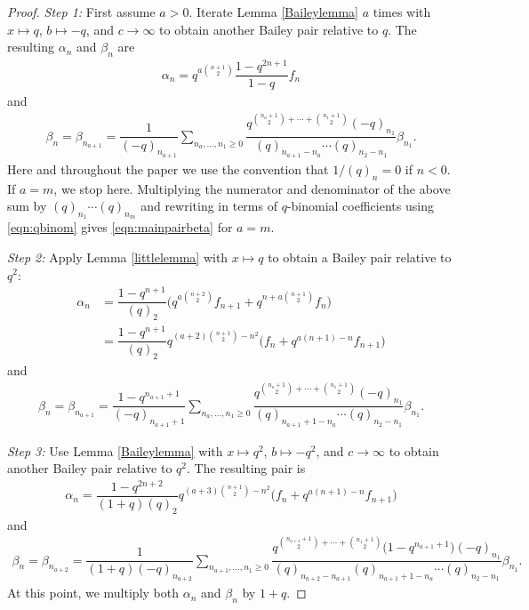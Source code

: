 \documentclass[11pt]{article}
\numberwithin{equation}{section}
\numberwithin{equation}{section}
\begin{document}
\begin{proof}
	{\it Step 1\emph{:}} First assume $a > 0$. Iterate Lemma \ref{Baileylemma} $a$ times with $x\mapsto q$, $b\mapsto -q$, and $c\rightarrow \infty$ to obtain another Bailey pair relative to $q$. The resulting $\alpha_n$ and $\beta_n$ are
	\begin{align}
		\alpha_n=q^{a\binom{n+1}{2}}\dfrac{1-q^{2n+1}}{1-q}f_n
		\label{eqn:alphafn}
	\end{align}
	and
	\begin{align}
		\beta_n=\beta_{n_{a+1}}=
		\dfrac{1}{(-q)_{n_{a+1}}}\sum_{n_a,\dots,n_1\geq 0}
		\dfrac{q^{\binom{n_a+1}{2}+\cdots+\binom{n_1+1}{2}}(-q)_{n_1}}{(q)_{n_{a+1}-n_a}\cdots (q)_{n_2-n_1}}\beta_{n_1}. \label{eqn:betastep1}
	\end{align}
	Here and throughout the paper we use the convention that $1/(q)_n = 0$ if $n <0$.
	If $a=m$, we stop here. Multiplying the numerator and denominator of the above sum by $(q)_{n_1} \cdots (q)_{n_m}$ and rewriting in terms of $q$-binomial coefficients using \eqref{eqn:qbinom} gives \eqref{eqn:mainpairbeta} for $a=m$.
	
	{\it Step 2\emph{:}} Apply Lemma \ref{littlelemma} with $x \mapsto q$ to obtain a Bailey pair relative to $q^2$:
	\begin{align*}
		\alpha_n &{}= \dfrac{1-q^{n+1}}{(q)_2}\bigl(
		q^{a\binom{n+2}{2}}f_{n+1} + q^{n+a\binom{n+1}{2}}f_n\bigr)\\
		&{}=\dfrac{1-q^{n+1}}{(q)_2}q^{(a+2)\binom{n+1}{2}-n^2}
		\bigl(
		f_n+q^{a(n+1)-n}f_{n+1}\bigr)
	\end{align*}
	and
	\begin{align*}
		\beta_n=\beta_{n_{a+1}}=
		\dfrac{1-q^{n_{a+1}+1}}{(-q)_{n_{a+1}+1}}\sum_{n_a,\dots,n_1\geq 0}
		\dfrac{q^{\binom{n_a+1}{2}+\cdots+\binom{n_1+1}{2}}(-q)_{n_1}}{(q)_{n_{a+1}+1-n_a}\cdots (q)_{n_2-n_1}}\beta_{n_1}.
	\end{align*}
	
	
	{\it Step 3\emph{:}} Use Lemma \ref{Baileylemma} with $x\mapsto q^2$, $b\mapsto-q^2$, and $c \to \infty$ to obtain another Bailey pair relative to $q^2$. The resulting pair is
	\begin{align*}
		\alpha_n
		=\dfrac{1-q^{2n+2}}{(1+q)(q)_2}q^{(a+3)\binom{n+1}{2}-n^2}
		\bigl(
		f_n+q^{a(n+1)-n}f_{n+1}\bigr)
	\end{align*}
	and
	\begin{align*}
		\beta_n=\beta_{n_{a+2}}=
		\dfrac{1}{(1+q)(-q)_{n_{a+2}}}\sum_{n_{a+1},\dots,n_1\geq 0}
		\dfrac{q^{\binom{n_{a+1}+1}{2}+\cdots+\binom{n_1+1}{2}}\bigl(1-q^{n_{a+1}+1}\bigr)(-q)_{n_1}}{(q)_{n_{a+2}-n_{a+1}}(q)_{n_{a+1}+1-n_a}\cdots (q)_{n_2-n_1}}\beta_{n_1}.
	\end{align*}
	At this point, we multiply both
	$\alpha_n$ and $\beta_n$ by $1+q$.
	

\end{proof}
\end{document}
